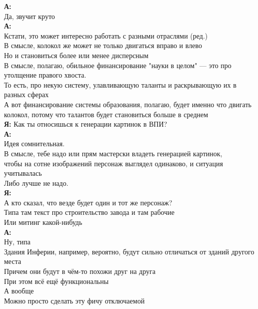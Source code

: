 \textbf{А:}\\
Да, звучит круто\\

\textbf{А:}\\
Кстати, это может интересно работать с разными отраслями (ред.)\\

В смысле, колокол же может не только двигаться вправо и влево\\
Но и становиться более или менее дисперсным\\

В смысле, полагаю, обильное финансирование "науки в целом" — это про утолщение правого хвоста.\\
То есть, про некую систему, улавливающую таланты и раскрывающую их в разных сферах\\

А вот финансирование системы образования, полагаю, будет именно что двигать колокол, потому что талантов будет становиться больше в среднем\\

\textbf{Я:} Как ты относишься к генерации картинок в ВПИ?\\

\textbf{А:}\\
Идея сомнительная.\\
В смысле, тебе надо или прям мастерски владеть генерацией картинок,\\
чтобы на сотне изображений персонаж выглядел одинаково, и ситуация учитывалась\\
Либо лучше не надо.\\

\textbf{Я:}\\
А кто сказал, что везде будет один и тот же персонаж?\\
Типа там текст про строительство завода и там рабочие\\
Или митинг какой-нибудь\\

\textbf{А:}\\
Ну, типа\\
Здания Инферии, например, вероятно, будут сильно отличаться от зданий другого места\\
Причем они будут в чём-то похожи друг на друга\\
При этом всё ещё функциональны\\
А вообще\\
Можно просто сделать эту фичу отключаемой\\


